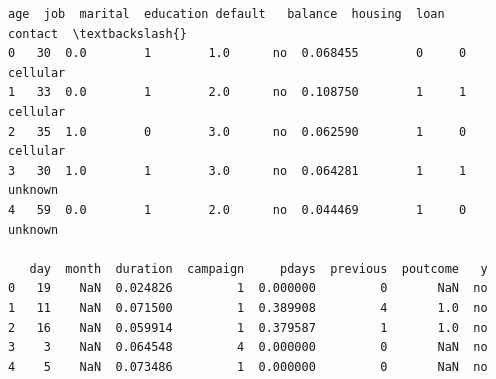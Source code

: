 \documentclass[11pt]{article}
\makeatletter
\newcommand{\boxspacing}{\kern\kvtcb@left@rule\kern\kvtcb@boxsep}
\newcommand{\prompt}[4]{
        {\ttfamily\llap{{\color{#2}[#3]:\hspace{3pt}#4}}\vspace{-\baselineskip}}
    }
\makeatother
\begin{document}
            \begin{tcolorbox}[breakable, size=fbox, boxrule=.5pt, pad at break*=1mm, opacityfill=0]
\prompt{Out}{outcolor}{18}{\boxspacing}
\begin{Verbatim}[commandchars=\\\{\}]
   age  job  marital  education default   balance  housing  loan   contact  \textbackslash{}
0   30  0.0        1        1.0      no  0.068455        0     0  cellular
1   33  0.0        1        2.0      no  0.108750        1     1  cellular
2   35  1.0        0        3.0      no  0.062590        1     0  cellular
3   30  1.0        1        3.0      no  0.064281        1     1   unknown
4   59  0.0        1        2.0      no  0.044469        1     0   unknown

   day  month  duration  campaign     pdays  previous  poutcome   y
0   19    NaN  0.024826         1  0.000000         0       NaN  no
1   11    NaN  0.071500         1  0.389908         4       1.0  no
2   16    NaN  0.059914         1  0.379587         1       1.0  no
3    3    NaN  0.064548         4  0.000000         0       NaN  no
4    5    NaN  0.073486         1  0.000000         0       NaN  no
\end{Verbatim}
\end{tcolorbox}
        


  
    
    
    
\end{document}
